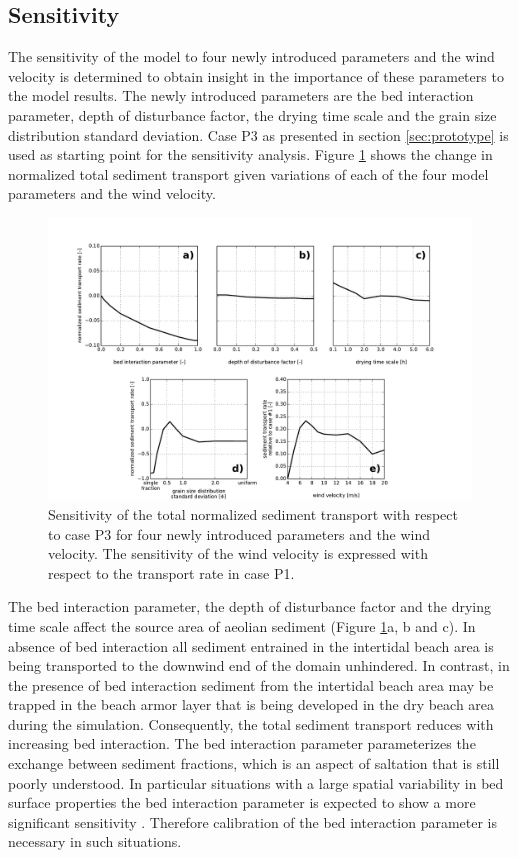 \subsection{Sensitivity}

The sensitivity of the model to four newly introduced parameters and
the wind velocity is determined to obtain insight in the importance of
these parameters to the model results. The newly introduced parameters
are the bed interaction parameter, depth of disturbance factor, the
drying time scale and the grain size distribution standard
deviation. Case P3 as presented in section \ref{sec:prototype} is used
as starting point for the sensitivity analysis. Figure
\ref{fig:sensitivity} shows the change in normalized total sediment
transport given variations of each of the four model parameters and
the wind velocity.

\begin{figure}
  \centering
  \includegraphics[width=\columnwidth]{../Figures/sensitivity_py}
  \caption{Sensitivity of the total normalized sediment transport with
    respect to case P3 for four newly introduced parameters and the
    wind velocity. The sensitivity of the wind velocity is expressed
    with respect to the transport rate in case P1.}
  \label{fig:sensitivity}
\end{figure}

The bed interaction parameter, the depth of disturbance factor and the
drying time scale affect the source area of aeolian sediment (Figure
\ref{fig:sensitivity}a, b and c). In absence of bed interaction all
sediment entrained in the intertidal beach area is being transported
to the downwind end of the domain unhindered. In contrast, in the
presence of bed interaction sediment from the intertidal beach area
may be trapped in the beach armor layer that is being developed in the
dry beach area during the simulation. Consequently, the total sediment
transport reduces with increasing bed interaction. The bed interaction
parameter parameterizes the exchange between sediment fractions, which
is an aspect of saltation that is still poorly understood.  In
particular situations with a large spatial variability in bed surface
properties the bed interaction parameter is expected to show a more
significant sensitivity \citep[e.g.][]{Dong2004b}. Therefore
calibration of the bed interaction parameter is necessary in such
situations.

